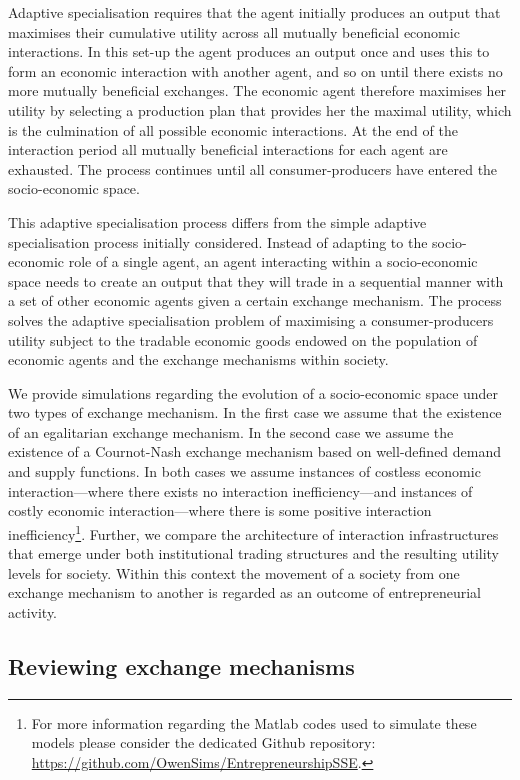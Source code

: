 Adaptive specialisation requires that the agent initially produces an output that maximises their cumulative utility across all mutually beneficial economic interactions. In this set-up the agent produces an output once and uses this to form an economic interaction with another agent, and so on until there exists no more mutually beneficial exchanges. The economic agent therefore maximises her utility by selecting a production plan that provides her the maximal utility, which is the culmination of all possible economic interactions. At the end of the interaction period all mutually beneficial interactions for each agent are exhausted. The process continues until all consumer-producers have entered the socio-economic space.

This adaptive specialisation process differs from the simple adaptive specialisation process initially considered. Instead of adapting to the socio-economic role of a single agent, an agent interacting within a socio-economic space needs to create an output that they will trade in a sequential manner with a set of other economic agents given a certain exchange mechanism. The process solves the adaptive specialisation problem of maximising a consumer-producers utility subject to the tradable economic goods endowed on the population of economic agents and the exchange mechanisms within society.

We provide simulations regarding the evolution of a socio-economic space under two types of exchange mechanism. In the first case we assume that the existence of an egalitarian exchange mechanism. In the second case we assume the existence of a Cournot-Nash exchange mechanism based on well-defined demand and supply functions. In both cases we assume instances of costless economic interaction---where there exists no interaction inefficiency---and instances of costly economic interaction---where there is some positive interaction inefficiency\footnote{For more information regarding the Matlab codes used to simulate these models please consider the dedicated Github repository: \href{https://github.com/OwenSims/EntrepreneurshipSSE}{https://github.com/OwenSims/EntrepreneurshipSSE}.}. Further, we compare the architecture of interaction infrastructures that emerge under both institutional trading structures and the resulting utility levels for society. Within this context the movement of a society from one exchange mechanism to another is regarded as an outcome of entrepreneurial activity.

\subsection{Reviewing exchange mechanisms}

